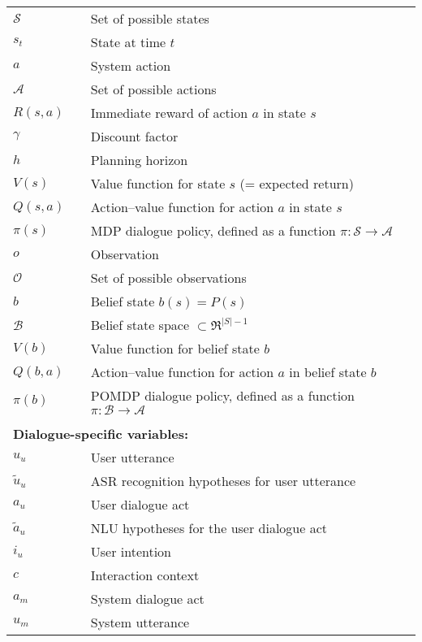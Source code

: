 \begin{longtable}{lp{5mm}p{11cm}}
$\mathcal{S}$ && Set of possible states \\
$s_t$ && State at time $t$ \\
$a$ && System action \\ 
$\mathcal{A}$ && Set of possible actions \\
$R(s,a)$ && Immediate reward of action $a$ in state $s$ \\
$\gamma$ && Discount factor \\
$h$ && Planning horizon \\
$V(s)$ && Value function for state $s$ (= expected return) \\
$Q(s,a)$ && Action--value function for action $a$ in state $s$  \\
$\pi(s)$ && MDP dialogue policy, defined as a function $\pi: \mathcal{S} \rightarrow \mathcal{A} $ \\
$o$ && Observation \\
$\mathcal{O}$ && Set of possible observations \\
$b$ && Belief state $b(s) = P(s)$ \\
$\mathcal{B}$ && Belief state space $\subset \Re^{|S|-1}$ \\
$V(b)$ && Value function for belief state $b$  \\
$Q(b,a)$ && Action--value function for action $a$ in belief state $b$ \\
$\pi(b)$ && POMDP dialogue policy, defined as a function $\pi: \mathcal{B} \rightarrow \mathcal{A} $ \\


&&  \vspace{3mm} \\
\multicolumn{3}{l}{\textbf{Dialogue-specific variables:}} \vspace{2mm} \\

$u_u$ && User utterance \\
$\tilde{u}_u$ && ASR recognition hypotheses for user utterance \\
$a_u$ && User dialogue act \\
$\tilde{a}_u$ && NLU hypotheses for the user dialogue act \\
$i_u$ && User intention \\
$c$ && Interaction context \\
$a_m$ && System dialogue act \\
$u_m$ && System utterance \\


\end{longtable}
